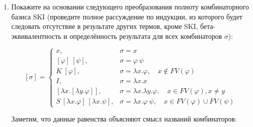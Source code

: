 \documentclass[10pt,a4paper,oneside]{article}
\begin{document}
\begin{enumerate}
\begin{comment}
Косвенным аргументом (пояснением, но не доказательством!) в пользу этой теоремы являются 
два следующих соображения:
\begin{itemize}
\item теорема о замкнутости ИфИИВ: если $\vdash \varphi$, то $\vdash_\rightarrow \varphi$,
значит, если выражение имеет тип, то этот тип можно получить с помощью доказательства в
стиле Гильберта;
\item типы комбинаторов $S$ и $K$ --- это, соответственно, вторая и первая схемы аксиом.
\end{itemize}

Докажите тип следующих выражений как логическое высказывание с помощью
гильбертового вывода и, пользуясь этим доказательством как источником вдохновения, 
выразите комбинаторы в базисе $SK$:
\begin{enumerate}
\item $\lambda x.\lambda y.\lambda z.y$
\item $\lambda x.\lambda y.\lambda z.y x z$
\item $\overline{1}$
\item $Not$
\item $Xor$
\item $InR$
\end{enumerate}
\end{comment}

\item Покажите на основании следующего преобразования полноту комбинаторного базиса SKI
(проведите полное рассуждение по индукции, из которого будет следовать отсутствие 
в результате других термов, кроме SKI, бета-эквивалентность
и определённость результата для всех комбинаторов $\sigma$):

$$[\sigma]=\left\{\begin{array}{ll}
x, & \sigma = x\\
\left[\varphi\right]\ [\psi], & \sigma = \varphi\ \psi\\
K\ [\varphi], & \sigma = \lambda x.\varphi,\quad x \notin FV(\varphi)\\
I, & \sigma = \lambda x.x \\
\left[\lambda x.\left[\lambda y.\varphi\right]\right], & \sigma = \lambda x.\lambda y.\varphi,\quad x \in FV(\varphi), x \ne y\\
S\ [\lambda x.\varphi]\ [\lambda x.\psi], & \sigma = \lambda x.\varphi\ \psi,\quad x \in FV(\varphi)\cup FV(\psi)
\end{array}\right.$$

Заметим, что данные равенства объясняют смысл названий комбинаторов:


\end{enumerate}
\end{document}
